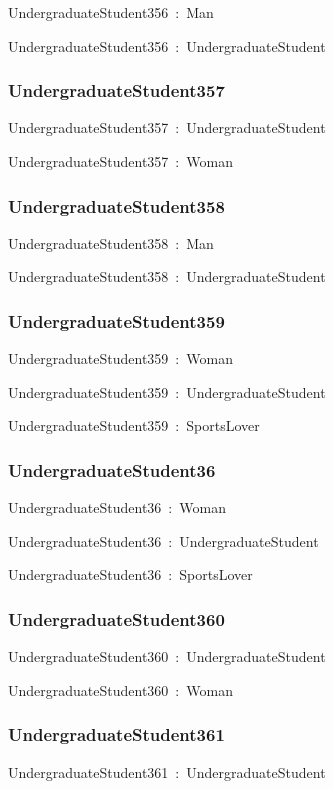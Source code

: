 \documentclass{article}
\begin{document}
UndergraduateStudent356~:~Man

UndergraduateStudent356~:~UndergraduateStudent

\subsubsection*{UndergraduateStudent357}

UndergraduateStudent357~:~UndergraduateStudent

UndergraduateStudent357~:~Woman

\subsubsection*{UndergraduateStudent358}

UndergraduateStudent358~:~Man

UndergraduateStudent358~:~UndergraduateStudent

\subsubsection*{UndergraduateStudent359}

UndergraduateStudent359~:~Woman

UndergraduateStudent359~:~UndergraduateStudent

UndergraduateStudent359~:~SportsLover

\subsubsection*{UndergraduateStudent36}

UndergraduateStudent36~:~Woman

UndergraduateStudent36~:~UndergraduateStudent

UndergraduateStudent36~:~SportsLover

\subsubsection*{UndergraduateStudent360}

UndergraduateStudent360~:~UndergraduateStudent

UndergraduateStudent360~:~Woman

\subsubsection*{UndergraduateStudent361}

UndergraduateStudent361~:~UndergraduateStudent
\end{document}
